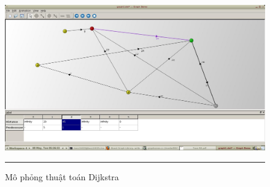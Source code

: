 \documentclass[a4paper,12pt]{report}
\begin{document}
\begin{figure}
    \centering
    \includegraphics[scale=0.3]{gd4}
    \rule{35em}{0.5pt}
    \caption{Mô phỏng thuật toán Dijkstra}
    \label{fig:Dijkstra1}
\end{figure}
    
\end{document}
